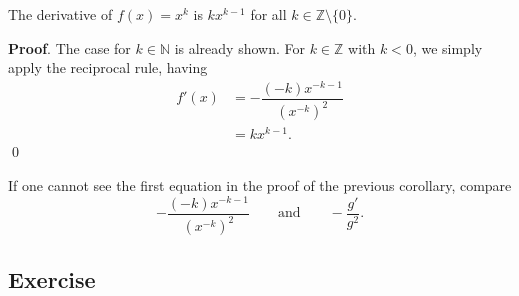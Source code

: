 \documentclass[11pt]{book}
\theoremstyle{break}
\theoremstyle{no_label}
\newcommand{\bbN}{\mathbb{N}}
\numberwithin{equation}{section}
\begin{document}
\begin{corollary}
    The derivative of $f(x)=x^k$ is $kx^{k-1}$ for all $k\in\mathbb{Z}\setminus\{0\}$.
\end{corollary}
\textbf{Proof}. The case for $k\in\bbN$ is already shown. For $k\in\mathbb{Z}$ with $k<0$, we simply apply the reciprocal rule, having \begin{align*}
    f'(x)&=-\dfrac{(-k)x^{-k-1}}{(x^{-k})^2}\\
    &=kx^{k-1}.
\end{align*} \qed

If one cannot see the first equation in the proof of the previous corollary, compare $$-\dfrac{(-k)x^{-k-1}}{(x^{-k})^2}\qquad\text{and}\qquad-\dfrac{g'}{g^2}.$$

\subsection*{Exercise}
\end{document}
